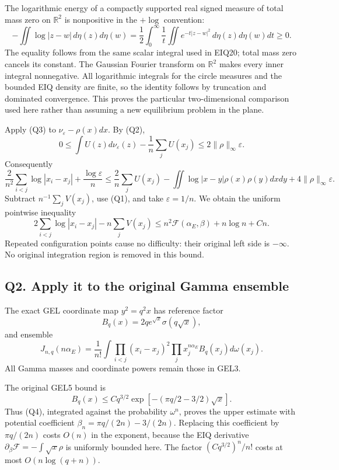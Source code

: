 The logarithmic energy of a compactly supported real signed measure of
total mass zero on \(\mathbb R^2\) is nonpositive in the \(+\log\)
convention: \[
-\iint\log|z-w|\,d\eta(z)d\eta(w)
=\frac12\int_0^\infty\frac1t\iint e^{-t|z-w|^2}\,d\eta(z)d\eta(w)dt\ge0.
\tag{Q3}
\] The equality follows from the same scalar integral used in EIQ20;
total mass zero cancels its constant. The Gaussian Fourier transform on
\(\mathbb R^2\) makes every inner integral nonnegative. All logarithmic
integrals for the circle measures and the bounded EIQ density are
finite, so the identity follows by truncation and dominated convergence.
This proves the particular two-dimensional comparison used here rather
than assuming a new equilibrium problem in the plane.

Apply (Q3) to \(\nu_\varepsilon-\rho(x)dx\). By (Q2), \[
0\le\int U(z)d\nu_\varepsilon(z)-\frac1n\sum_jU(x_j)
\le2\|\rho\|_\infty\varepsilon.
\] Consequently \[
\frac2{n^2}\sum_{i<j}\log|x_i-x_j|+\frac{\log\varepsilon}{n}
\le\frac2n\sum_jU(x_j)-\iint\log|x-y|\rho(x)\rho(y)dxdy
+4\|\rho\|_\infty\varepsilon.
\] Subtract \(n^{-1}\sum_jV(x_j)\), use (Q1), and take
\(\varepsilon=1/n\). We obtain the uniform pointwise inequality \[
\boxed{2\sum_{i<j}\log|x_i-x_j|-n\sum_jV(x_j)
\le n^2\mathcal F(\alpha_E,\beta)+n\log n+C n.}
\tag{Q4}
\] Repeated configuration points cause no difficulty: their original
left side is \(-\infty\). No original integration region is removed in
this bound.

\subsection{Q2. Apply it to the original Gamma
ensemble}\label{sa:q2.-apply-it-to-the-original-gamma-ensemble}

The exact GEL coordinate map \(y^2=q^2x\) has reference factor \[
B_q(x)=2q e^{\sqrt x}\sigma(q\sqrt x),
\] and ensemble \[
J_{n,q}(n\alpha_E)=\frac1{n!}\int\prod_{i<j}(x_i-x_j)^2
\prod_jx_j^{n\alpha_E}B_q(x_j)d\omega(x_j).
\tag{Q5}
\] All Gamma masses and coordinate powers remain those in GEL3.

The original GEL5 bound is \[
B_q(x)\le Cq^{3/2}\exp[-(\pi q/2-3/2)\sqrt x].
\] Thus (Q4), integrated against the probability \(\omega^n\), proves
the upper estimate with potential coefficient
\(\beta_n=\pi q/(2n)-3/(2n)\). Replacing this coefficient by
\(\pi q/(2n)\) costs \(O(n)\) in the exponent, because the EIQ
derivative \(\partial_\beta\mathcal F=-\int\sqrt x\rho\) is uniformly
bounded here. The factor \((Cq^{3/2})^n/n!\) costs at most
\(O(n\log(q+n))\).

